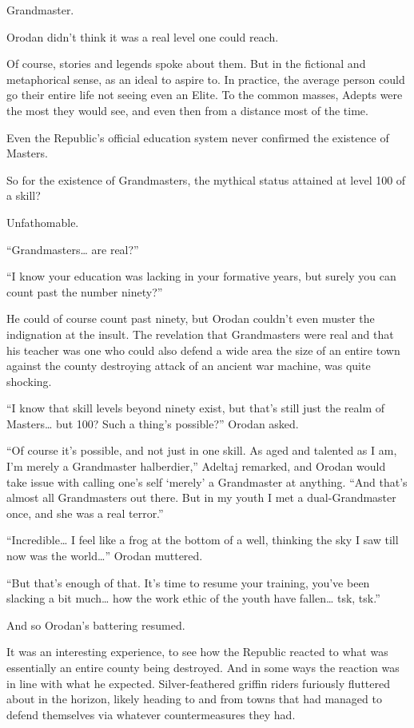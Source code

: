 \documentclass[a4paper,10pt]{book}
\begin{document}
Grandmaster.\par
Orodan didn’t think it was a real level one could reach.\par
Of course, stories and legends spoke about them. But in the fictional and metaphorical sense, as an ideal to aspire to. In practice, the average person could go their entire life not seeing even an Elite. To the common masses, Adepts were the most they would see, and even then from a distance most of the time.\par
Even the Republic’s official education system never confirmed the existence of Masters.\par
So for the existence of Grandmasters, the mythical status attained at level 100 of a skill?\par
Unfathomable.\par
“Grandmasters… are real?”\par
“I know your education was lacking in your formative years, but surely you can count past the number ninety?”\par
He could of course count past ninety, but Orodan couldn’t even muster the indignation at the insult. The revelation that Grandmasters were real and that his teacher was one who could also defend a wide area the size of an entire town against the county destroying attack of an ancient war machine, was quite shocking.\par
“I know that skill levels beyond ninety exist, but that’s still just the realm of Masters… but 100? Such a thing’s possible?” Orodan asked.\par
“Of course it’s possible, and not just in one skill. As aged and talented as I am, I’m merely a Grandmaster halberdier,” Adeltaj remarked, and Orodan would take issue with calling one’s self ‘merely’ a Grandmaster at anything. “And that’s almost all Grandmasters out there. But in my youth I met a dual-Grandmaster once, and she was a real terror.”\par
“Incredible… I feel like a frog at the bottom of a well, thinking the sky I saw till now was the world…” Orodan muttered.\par
“But that’s enough of that. It’s time to resume your training, you’ve been slacking a bit much… how the work ethic of the youth have fallen… tsk, tsk.”\par
And so Orodan’s battering resumed.\par
\par
It was an interesting experience, to see how the Republic reacted to what was essentially an entire county being destroyed. And in some ways the reaction was in line with what he expected. Silver-feathered griffin riders furiously fluttered about in the horizon, likely heading to and from towns that had managed to defend themselves via whatever countermeasures they had.\par
\end{document}

